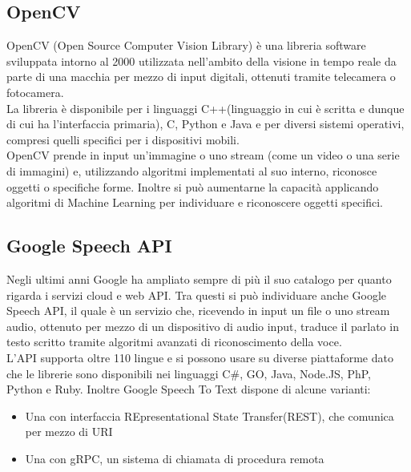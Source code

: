 \subsection{OpenCV}
OpenCV (Open Source Computer Vision Library) \`e una libreria software sviluppata intorno al 2000
utilizzata nell'ambito della visione in tempo reale
da parte di una macchia per mezzo di input digitali, ottenuti tramite telecamera o fotocamera.\\
La libreria \`e disponibile per i linguaggi C++(linguaggio in cui \`e scritta e dunque di cui ha l'interfaccia primaria), C, Python e Java e
per diversi sistemi operativi, compresi quelli specifici per i dispositivi mobili.\\
OpenCV prende in input un'immagine o uno stream (come un video o una serie di immagini) e, utilizzando algoritmi
 implementati al suo interno, riconosce oggetti o specifiche forme.
Inoltre si pu\`o aumentarne la capacit\`a
applicando algoritmi di Machine Learning per individuare e riconoscere oggetti specifici.

\subsection{Google Speech API}
Negli ultimi anni Google ha ampliato sempre di pi\`u il suo catalogo per quanto rigarda
i servizi cloud e web API.
Tra questi si pu\`o individuare anche Google Speech API, il quale \`e un
servizio che, ricevendo in input un file o uno stream audio, ottenuto per mezzo di un
dispositivo di audio input, traduce il parlato in testo scritto tramite algoritmi avanzati
di riconoscimento della voce.\\
L'API supporta oltre 110 lingue e si possono usare su diverse piattaforme dato che
le librerie sono disponibili nei linguaggi C\#, GO, Java, Node.JS, PhP, Python e Ruby.
Inoltre Google Speech To Text dispone di alcune varianti:
\begin{itemize}
\item Una con interfaccia REpresentational State Transfer(REST), che comunica per mezzo di URI
\item Una con gRPC, un sistema di chiamata di procedura remota
\end{itemize}

\iffalse
